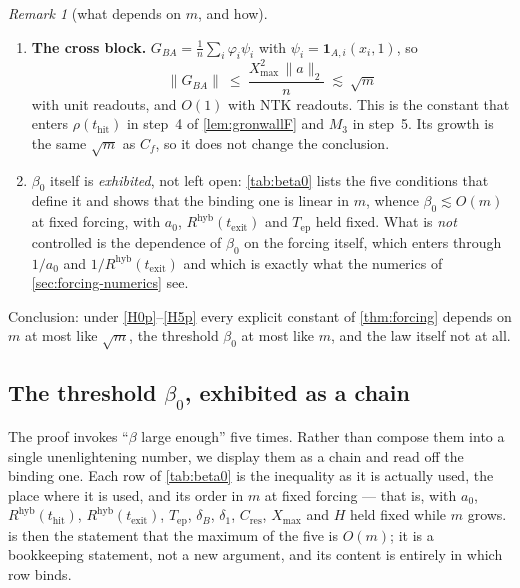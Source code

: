\documentclass[11pt]{article}
\theoremstyle{definition}
\theoremstyle{remark}
\newtheorem{remark}[remark]{Remark}
\newcommand{\thit}{t_{\mathrm{hit}}}
\newcommand{\texit}{t_{\mathrm{exit}}}
\newcommand{\Tep}{T_{\mathrm{ep}}}   %
\newcommand{\hyb}{\mathrm{hyb}}
\begin{document}
\begin{remark}[what depends on $m$, and how]
\begin{enumerate}
\item[(U-new)] \textbf{The cross block.} $G_{BA}=\frac1n\sum_i\varphi_i\psi_i$
with $\psi_i=\mathbf1_{A,i}(x_i,1)$, so
\[
\|G_{BA}\|\ \le\ \frac{X_{\max}^2\,\|a\|_2}{n}\ \lesssim\ \sqrt m
\]
with unit readouts, and $O(1)$ with NTK readouts. This is the constant that
enters $\rho(\thit)$ in step~4 of \cref{lem:gronwallF} and $M_3$ in step~5. Its
growth is the same $\sqrt m$ as $C_f$, so it does not change the conclusion.
\item[(U6)] $\beta_0$ itself is \emph{exhibited}, not left open:
\cref{tab:beta0} lists the five conditions that define it and shows that the
binding one is linear in $m$, whence $\beta_0\lesssim O(m)$ at fixed forcing,
with $a_0$, $R^{\hyb}(\texit)$ and $\Tep$ held fixed. What is \emph{not}
controlled is the dependence of $\beta_0$ on the forcing itself, which enters
through $1/a_0$ and $1/R^{\hyb}(\texit)$ and which is exactly what the numerics
of \cref{sec:forcing-numerics} see.
\end{enumerate}
Conclusion: under \eqref{H0p}--\eqref{H5p} every explicit constant of
\cref{thm:forcing} depends on $m$ at most like $\sqrt m$, the threshold
$\beta_0$ at most like $m$, and the law itself not at all.
\end{remark}

\subsection{The threshold \texorpdfstring{$\beta_0$}{beta0}, exhibited as a
chain}\label{app:forcing-beta0}

The proof invokes ``$\beta$ large enough'' five times. Rather than compose them
into a single unenlightening number, we display them as a chain and read off the
binding one. Each row of \cref{tab:beta0} is the inequality as it is actually
used, the place where it is used, and its order in $m$ at fixed forcing --- that
is, with $a_0$, $R^{\hyb}(\thit)$, $R^{\hyb}(\texit)$, $\Tep$, $\delta_B$,
$\delta_1$, $C_{\mathrm{res}}$, $X_{\max}$ and $H$ held fixed while $m$ grows.
 is then the statement that the maximum of the five is $O(m)$;
it is a bookkeeping statement, not a new argument, and its content is entirely
in which row binds.
\end{document}
